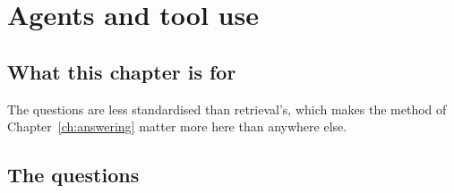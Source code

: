 \chapter{Agents and tool use}
\label{ch:agents}

\section*{What this chapter is for}

 The questions are less standardised than
retrieval's, which makes the method of Chapter~\ref{ch:answering} matter more
here than anywhere else.

\section*{The questions}

